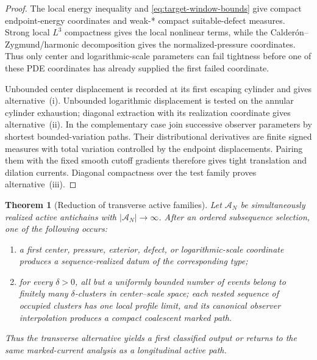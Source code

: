 \documentclass[11pt]{amsart}
\numberwithin{equation}{section}
\theoremstyle{plain}
\newtheorem{theorem}{Theorem}[section]
\theoremstyle{definition}
\theoremstyle{remark}
\begin{document}
\begin{proof}
The local energy inequality and \eqref{eq:target-window-bounds} give compact
endpoint-energy coordinates and weak-* compact suitable-defect measures.
Strong local \(L^3\) compactness gives the local nonlinear terms, while the
Calder\'on--Zygmund/harmonic decomposition gives the normalized-pressure
coordinates.  Thus only center and logarithmic-scale parameters can fail
tightness before one of these PDE coordinates has already supplied the first
failed coordinate.

Unbounded center displacement is recorded at its first escaping cylinder and
gives alternative~\textup{(i)}.  Unbounded logarithmic displacement is tested
on the annular cylinder exhaustion; diagonal extraction with its realization
coordinate gives alternative~\textup{(ii)}.  In the complementary case join
successive observer parameters by shortest bounded-variation paths.  Their
distributional derivatives are finite signed measures with total variation
controlled by the endpoint displacements.  Pairing them with the fixed smooth
cutoff gradients therefore gives tight translation and dilation currents.
Diagonal compactness over the test family proves alternative~\textup{(iii)}.
\end{proof}

\begin{theorem}[Reduction of transverse active families]
\label{thm:transverse-active-family-reduction}
Let \(\mathcal A_N\) be simultaneously realized active antichains with
\(|\mathcal A_N|\to\infty\).  After an ordered subsequence selection, one of
the following occurs:
\begin{enumerate}[label=\textup{(\roman*)},leftmargin=2.2em]
\item a first center, pressure, exterior, defect, or logarithmic-scale
coordinate produces a sequence-realized datum of the corresponding type;
\item for every \(\delta>0\), all but a uniformly bounded number of events
belong to finitely many \(\delta\)-clusters in center--scale space; each
nested sequence of occupied clusters has one local profile limit, and its
canonical observer interpolation produces a compact coalescent marked path.
\end{enumerate}
Thus the transverse alternative yields a first classified output or returns
to the same marked-current analysis as a longitudinal active path.
\end{theorem}
\end{document}
